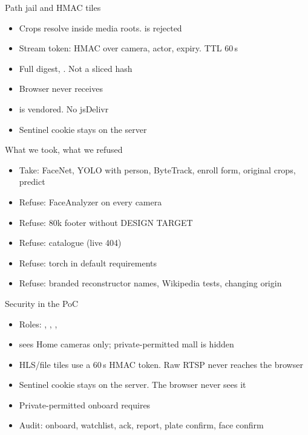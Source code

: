\documentclass[aspectratio=169,11pt]{beamer}
\begin{document}
\begin{frame}{Path jail and HMAC tiles}
\begin{itemize}\itemsep0.55em
\item Crops resolve inside media roots.  is rejected
\item Stream token: HMAC over camera, actor, expiry. TTL 60\,s
\item Full digest, . Not a sliced hash
\item Browser never receives 
\item {} is vendored. No jsDelivr
\item Sentinel cookie stays on the server
\end{itemize}
\end{frame}

\begin{frame}{What we took, what we refused}
\begin{itemize}\itemsep0.45em
\item Take: FaceNet, YOLO with person, ByteTrack, enroll form, original crops, predict
\item Refuse: FaceAnalyzer on every camera
\item Refuse: 80k footer without DESIGN TARGET
\item Refuse: catalogue  (live 404)
\item Refuse: torch in default requirements
\item Refuse: branded reconstructor names, Wikipedia tests, changing origin
\end{itemize}
\end{frame}

\begin{frame}{Security in the PoC}
\begin{itemize}\itemsep0.55em
\item Roles: , , , 
\item {} sees Home cameras only; private-permitted mall is hidden
\item HLS/file tiles use a 60\,s HMAC token. Raw RTSP never reaches the browser
\item Sentinel cookie stays on the server. The browser never sees it
\item Private-permitted onboard requires 
\item Audit: onboard, watchlist, ack, report, plate confirm, face confirm
\end{itemize}
\end{frame}
\end{document}
